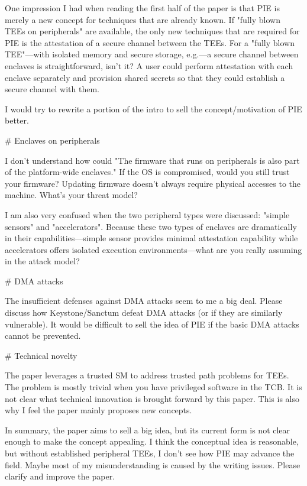 One impression I had when reading the first half of the paper is that PIE is merely a new concept for techniques that are already known. If "fully blown TEEs on peripherals" are available, the only new techniques that are required for PIE is the attestation of a secure channel between the TEEs. For a "fully blown TEE"---with isolated memory and secure storage, e.g.---a secure channel between enclaves is straightforward, isn't it? A user could perform attestation with each enclave separately and provision shared secrets so that they could establish a secure channel with them. 

I would try to rewrite a portion of the intro to sell the concept/motivation of PIE better. 

# Enclaves on peripherals

I don't understand how could "The firmware that runs on peripherals is also part of the platform-wide enclaves." If the OS is compromised, would you still trust your firmware? Updating firmware doesn't always require physical accesses to the machine. What's your threat model?

I am also very confused when the two peripheral types were discussed: "simple sensors" and "accelerators".  Because these two types of enclaves are dramatically in their capabilities---simple sensor provides minimal attestation capability while accelerators offers isolated execution environments---what are you really assuming in the attack model?

# DMA attacks

The insufficient defenses against DMA attacks seem to me a big deal. Please discuss how Keystone/Sanctum defeat DMA attacks (or if they are similarly vulnerable). It would be difficult to sell the idea of PIE if the basic DMA attacks cannot be prevented. 

# Technical novelty

The paper leverages a trusted SM to address trusted path problems for TEEs. The problem is mostly trivial when you have privileged software in the TCB. It is not clear what technical innovation is brought forward by this paper. This is also why I feel the paper mainly proposes new concepts.


In summary, the paper aims to sell a big idea, but its current form is not clear enough to make the concept appealing. I think the conceptual idea is reasonable, but without established peripheral TEEs, I don't see how PIE may advance the field. Maybe most of my misunderstanding is caused by the writing issues. Please clarify and improve the paper.



